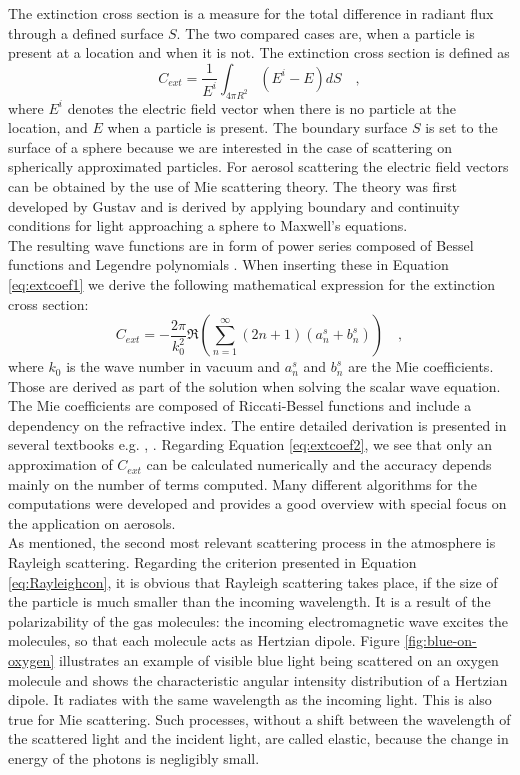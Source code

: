 The extinction cross section is a measure for the total difference in radiant flux through a defined surface $S$. The two compared cases are, when a particle is present at a location and when it is not. The extinction cross section is defined as 
\begin{equation}
C_{ext}=\frac{1}{E^{i}} \int_{4\pi R^{2}} (E^{i}-E)dS \quad ,
\label{eq:extcoef1}
\end{equation}
where $E^{i}$ denotes the electric field vector when there is no particle at the location, and $E$ when a particle is present. The boundary surface $S$ is set to the surface of a sphere because we are interested in the case of scattering on spherically approximated particles.
For aerosol scattering the electric field vectors can be obtained by the use of Mie scattering theory. The theory was first developed by Gustav    \citeauthor{mie1908beitrage} \cite{mie1908beitrage} and is derived by applying boundary and continuity conditions for light approaching a sphere to Maxwell's equations.\\
The resulting wave functions are in form of power series composed of Bessel functions and Legendre polynomials \parencite{kerker2016scattering}.
When inserting these in Equation \eqref{eq:extcoef1} we derive the following mathematical expression for the extinction cross section:
\begin{equation}
C_{ext}=-\frac{2 \pi }{k^{2}_{0}} \Re \left( \sum_{n=1}^{ \infty} (2n +1) (a^{s}_{n} + b^{s}_{n}) \right) \quad ,
\label{eq:extcoef2}
\end{equation}
where $k_{0}$ is the wave number in vacuum and $a^{s}_{n}$ and  $b^{s}_{n}$ are the Mie coefficients. Those are derived as part of the solution when solving the scalar wave equation. The Mie coefficients are composed of Riccati-Bessel functions and include a dependency on the refractive index. The entire detailed derivation is presented in several textbooks e.g. \cite{zdunkowski2007radiation}, \cite{hulst1957light}.
Regarding Equation \eqref{eq:extcoef2}, we see that only an approximation of $C_{ext}$ can be calculated numerically and the accuracy depends mainly on the number of terms computed. Many different algorithms for the computations were developed and \citeauthor{wriedt2009light} \cite{wriedt2009light} provides a good overview with special focus on the application on aerosols. \\
As mentioned, the second most relevant scattering process in the atmosphere is Rayleigh scattering. Regarding the criterion presented in Equation \eqref{eq:Rayleighcon}, it is obvious that Rayleigh scattering takes place, if the size of the particle is much smaller than the incoming wavelength. It is a result of the polarizability of the gas molecules: the incoming electromagnetic wave excites the molecules, so that each molecule acts as Hertzian dipole. Figure \ref{fig:blue-on-oxygen} illustrates an example of visible blue light being scattered on an oxygen molecule and shows the characteristic angular intensity distribution of a Hertzian dipole. It radiates  with the same wavelength as the incoming light. This is also true for Mie scattering.
Such processes, without a shift between the wavelength of the scattered light and the incident light, are called elastic, because the change in energy of the photons is negligibly small.
